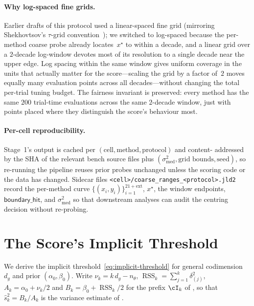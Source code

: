 \documentclass{article}
\DeclareMathOperator{\RSS}{RSS}
\begin{document}
	\paragraph{Why log-spaced fine grids.}
	Earlier drafts of this protocol used a linear-spaced fine
	grid (mirroring Shekhovtsov's $\tau$-grid
	convention~\cite{Shekhovtsov2025}); we switched to log-spaced
	because the per-method coarse probe already locates~$x^\star$
	to within a decade, and a linear grid over a $2$-decade
	log-window devotes most of its resolution to a single decade
	near the upper edge.  Log spacing within the same window
	gives uniform coverage in the units that actually matter for
	the score---scaling the grid by a factor of~$2$ moves equally
	many evaluation points across all decades---without changing
	the total per-trial tuning budget.  The fairness invariant is
	preserved: every method has the same $200$ trial-time
	evaluations across the same $2$-decade window, just with
	points placed where they distinguish the score's behaviour
	most.

	\paragraph{Per-cell reproducibility.}
	Stage~1's output is cached per
	$(\text{cell}, \text{method}, \text{protocol})$ and content-
	addressed by the SHA of the relevant bench source files plus
	$(\sigma^2_{\mathrm{med}}, \text{grid bounds},
		\text{seed})$, so re-running the pipeline reuses prior probes
	unchanged unless the scoring code or the data has changed.
	Sidecar files
	\texttt{<cell>/coarse\_ranges\_<protocol>.jld2} record the
	per-method curve $\{(x_i, y_i)\}_{i=1}^{21+\text{ext}}$,
	$x^\star$, the window endpoints, $\textsf{boundary\_hit}$, and
	$\sigma^2_{\mathrm{med}}$ so that downstream analyses can
	audit the centring decision without re-probing.
\fi  %

\section{The Score's Implicit Threshold}
\label{sec:implicit-threshold}

We derive the implicit threshold~\eqref{eq:implicit-threshold} for
general codimension~$d_g$ and prior $(\alpha_0, \beta_0)$.  Write
$\nu_k = k\,d_g - n_\theta$, $\RSS_k = \sum_{j=1}^{k} \delta_{(j)}^2$,
$A_k = \alpha_0 + \nu_k/2$ and $B_k = \beta_0 + \RSS_k/2$ for the
prefix $\cI_k$ of , so that
$\hat s_k^2 = B_k/A_k$ is the variance estimate of .
\end{document}
